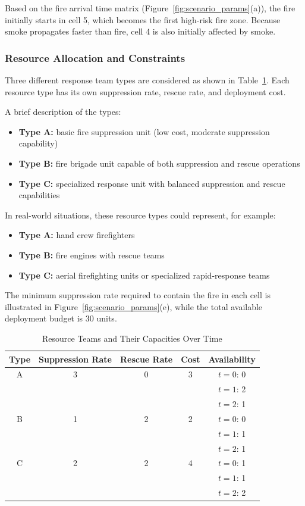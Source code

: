 Based on the fire arrival time matrix (Figure~\ref{fig:scenario_params}(a)), the fire initially starts in cell 5, which becomes the first high-risk fire zone. Because smoke propagates faster than fire, cell 4 is also initially affected by smoke.

\subsubsection{Resource Allocation and Constraints}
Three different response team types are considered as shown in Table~\ref{tab:resources}. Each resource type has its own suppression rate, rescue rate, and deployment cost.

A brief description of the types:
\begin{itemize}
\item \textbf{Type A:} basic fire suppression unit (low cost, moderate suppression capability)
\item \textbf{Type B:} fire brigade unit capable of both suppression and rescue operations
\item \textbf{Type C:} specialized response unit with balanced suppression and rescue capabilities
\end{itemize}

In real-world situations, these resource types could represent, for example:

\begin{itemize}
\item \textbf{Type A:} hand crew firefighters
\item \textbf{Type B:} fire engines with rescue teams
\item \textbf{Type C:} aerial firefighting units or specialized rapid-response teams
\end{itemize}

The minimum suppression rate required to contain the fire in each cell is illustrated in Figure~\ref{fig:scenario_params}(e), while the total available deployment budget is 30 units.

\begin{table}[!htb]
\centering
\footnotesize   %
\setlength{\tabcolsep}{4pt}
\caption{Resource Teams and Their Capacities Over Time}
\label{tab:resources}
\begin{tabular}{@{} c c c c c @{}}
\toprule
\textbf{Type} & \textbf{Suppression Rate} & \textbf{Rescue Rate} & \textbf{Cost} & \textbf{Availability} \\
\midrule
A & 3 & 0 & 3 & $t=0$: 0 \\
  &   &   &   & $t=1$: 2 \\
  &   &   &   & $t=2$: 1 \\
\midrule
B & 1 & 2 & 2 & $t=0$: 0 \\
  &   &   &   & $t=1$: 1 \\
  &   &   &   & $t=2$: 1 \\
\midrule
C & 2 & 2 & 4 & $t=0$: 1 \\
  &   &   &   & $t=1$: 1 \\
  &   &   &   & $t=2$: 2 \\
\bottomrule
\end{tabular}
\end{table}


